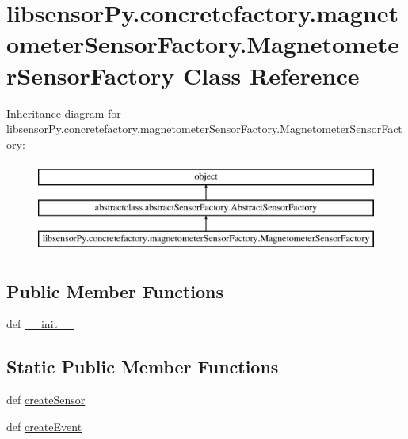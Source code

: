 \hypertarget{classlibsensorPy_1_1concretefactory_1_1magnetometerSensorFactory_1_1MagnetometerSensorFactory}{}\section{libsensor\+Py.\+concretefactory.\+magnetometer\+Sensor\+Factory.\+Magnetometer\+Sensor\+Factory Class Reference}
\label{classlibsensorPy_1_1concretefactory_1_1magnetometerSensorFactory_1_1MagnetometerSensorFactory}
Inheritance diagram for libsensor\+Py.\+concretefactory.\+magnetometer\+Sensor\+Factory.\+Magnetometer\+Sensor\+Factory\+:\begin{figure}[H]
\begin{center}
\leavevmode
\includegraphics[height=3.000000cm]{classlibsensorPy_1_1concretefactory_1_1magnetometerSensorFactory_1_1MagnetometerSensorFactory}
\end{center}
\end{figure}
\subsection*{Public Member Functions}
\begin{DoxyCompactItemize}
\item 
def \hyperlink{classlibsensorPy_1_1concretefactory_1_1magnetometerSensorFactory_1_1MagnetometerSensorFactory_af9fdeb376b0d71012d97c2b211fdeb7c}{\+\_\+\+\_\+init\+\_\+\+\_\+}
\end{DoxyCompactItemize}
\subsection*{Static Public Member Functions}
\begin{DoxyCompactItemize}
\item 
def \hyperlink{classlibsensorPy_1_1concretefactory_1_1magnetometerSensorFactory_1_1MagnetometerSensorFactory_ad18a20585c71a9c5788591caaac7f415}{create\+Sensor}
\item 
def \hyperlink{classlibsensorPy_1_1concretefactory_1_1magnetometerSensorFactory_1_1MagnetometerSensorFactory_a0cc15ef2d293d4a62d51d2cdb60f1045}{create\+Event}
\end{DoxyCompactItemize}



